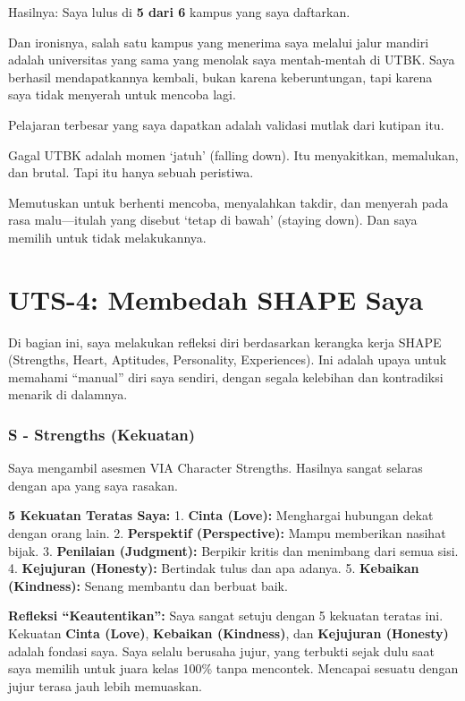 \documentclass[
  letterpaper,
  DIV=11,
  numbers=noendperiod]{scrreprt}
\begin{document}
Hasilnya: Saya lulus di \textbf{5 dari 6} kampus yang saya daftarkan.

Dan ironisnya, salah satu kampus yang menerima saya melalui jalur
mandiri adalah universitas yang sama yang menolak saya mentah-mentah di
UTBK. Saya berhasil mendapatkannya kembali, bukan karena keberuntungan,
tapi karena saya tidak menyerah untuk mencoba lagi.

Pelajaran terbesar yang saya dapatkan adalah validasi mutlak dari
kutipan itu.

Gagal UTBK adalah momen `jatuh' (falling down). Itu menyakitkan,
memalukan, dan brutal. Tapi itu hanya sebuah peristiwa.

Memutuskan untuk berhenti mencoba, menyalahkan takdir, dan menyerah pada
rasa malu---itulah yang disebut `tetap di bawah' (staying down). Dan
saya memilih untuk tidak melakukannya.


\chapter{UTS-4: Membedah SHAPE Saya}\label{uts-4-membedah-shape-saya}

Di bagian ini, saya melakukan refleksi diri berdasarkan kerangka kerja
SHAPE (Strengths, Heart, Aptitudes, Personality, Experiences). Ini
adalah upaya untuk memahami ``manual'' diri saya sendiri, dengan segala
kelebihan dan kontradiksi menarik di dalamnya.

\subsection{S - Strengths (Kekuatan)}\label{s---strengths-kekuatan}

Saya mengambil asesmen VIA Character Strengths. Hasilnya sangat selaras
dengan apa yang saya rasakan.

\textbf{5 Kekuatan Teratas Saya:} \textbar{} 1. \textbf{Cinta (Love):}
Menghargai hubungan dekat dengan orang lain. \textbar{} 2.
\textbf{Perspektif (Perspective):} Mampu memberikan nasihat bijak.
\textbar{} 3. \textbf{Penilaian (Judgment):} Berpikir kritis dan
menimbang dari semua sisi. \textbar{} 4. \textbf{Kejujuran (Honesty):}
Bertindak tulus dan apa adanya. \textbar{} 5. \textbf{Kebaikan
(Kindness):} Senang membantu dan berbuat baik.

\textbf{Refleksi ``Keautentikan'':} Saya sangat setuju dengan 5 kekuatan
teratas ini. Kekuatan \textbf{Cinta (Love)}, \textbf{Kebaikan
(Kindness)}, dan \textbf{Kejujuran (Honesty)} adalah fondasi saya. Saya
selalu berusaha jujur, yang terbukti sejak dulu saat saya memilih untuk
juara kelas 100\% tanpa mencontek. Mencapai sesuatu dengan jujur terasa
jauh lebih memuaskan.
\end{document}

